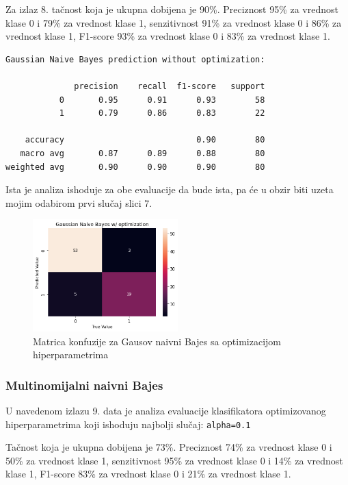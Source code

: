 \documentclass[fontsize=12bp, paper=a4]{scrarticle}
\begin{document}
Za izlaz 8. tačnost koja je ukupna dobijena je 90\%. Preciznost 95\% za vrednost klase 0 i 79\% za vrednost klase 1, senzitivnost 91\% za vrednost klase 0 i 86\% za vrednost klase 1, F1-score 93\% za vrednost klase 0 i 83\% za vrednost klase 1.

\begin{lstlisting}[caption=Gausov naivni Bajes bez optimizacija hiperparametara]
Gaussian Naive Bayes prediction without optimization:

              precision    recall  f1-score   support
           0       0.95      0.91      0.93        58
           1       0.79      0.86      0.83        22

    accuracy                           0.90        80
   macro avg       0.87      0.89      0.88        80
weighted avg       0.90      0.90      0.90        80
\end{lstlisting}


Ista je analiza ishoduje za obe evaluacije da bude ista, pa će u obzir biti uzeta mojim odabirom prvi slučaj slici 7.

\begin{figure}[h!]
    \centering
    \includegraphics[width=0.5\textwidth]{36}
    \caption{Matrica konfuzije za Gausov naivni Bajes sa optimizacijom hiperparametrima}
\end{figure}

\subsubsection{Multinomijalni naivni Bajes}

U navedenom izlazu 9. data je analiza evaluacije klasifikatora 
 optimizovanog hiperparametrima koji ishoduju najbolji slučaj: \verb|alpha=0.1|
 
 Tačnost koja je ukupna dobijena je 73\%. Preciznost 74\% za vrednost klase 0 i 50\% za vrednost klase 1, senzitivnost 95\% za vrednost klase 0 i 14\% za vrednost klase 1, F1-score 83\% za vrednost klase 0 i 21\% za vrednost klase 1.
\end{document}
